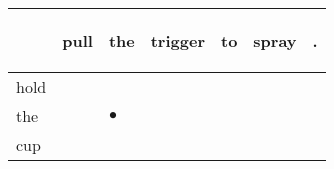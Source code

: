 \documentclass[landscape]{article}
\newcommand{\ssp}{\hspace{2pt}}
\newcommand{\mex}{\cellcolor{g}$\bullet$}
\begin{document}
\noindent\begin{tabular}{|l|p{10pt}|p{10pt}|p{10pt}|p{10pt}|p{10pt}|p{10pt}|}
\hline
&\begin{sideways}\cellcolor{ref0}pull\hspace{12pt}\end{sideways}&\begin{sideways}\cellcolor{ref1}the\hspace{12pt}\end{sideways}&\begin{sideways}\cellcolor{ref2}trigger\hspace{12pt}\end{sideways}&\begin{sideways}\cellcolor{ref3}to\hspace{12pt}\end{sideways}&\begin{sideways}\cellcolor{ref4}spray\hspace{12pt}\end{sideways}&\begin{sideways}\cellcolor{ref5}.\hspace{12pt}\end{sideways}\\
\hline
\ssp hold \ssp&\hspace{2pt}&\hspace{2pt}&\hspace{2pt}&\hspace{2pt}&\hspace{2pt}&\hspace{2pt}\\
\hline
\ssp \cellcolor{ref1}the \ssp&\hspace{2pt}&\hspace{2pt}\mex&\hspace{2pt}&\hspace{2pt}&\hspace{2pt}&\hspace{2pt}\\
\hline
\ssp cup \ssp&\hspace{2pt}&\hspace{2pt}&\hspace{2pt}&\hspace{2pt}&\hspace{2pt}&\hspace{2pt}\\

\end{tabular}
\end{document}
